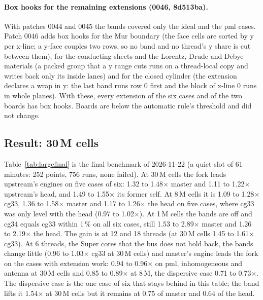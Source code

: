 \paragraph{Box hooks for the remaining extensions (0046, 8d513ba).} With patches 0044 and 0045 the bands covered only the
ideal and the pml cases. Patch 0046 adds box hooks for the Mur boundary (the face cells are sorted by y per x-line; a y-face
couples two rows, so no band and no thread's y share is cut between them), for the conducting sheets and the Lorentz, Drude and
Debye materials (a packed group that a y range cuts runs on a thread-local copy and writes back only its inside lanes) and
for the closed cylinder (the extension declares a wrap in y: the last band runs row 0 first and the block of x-line 0
runs in whole planes). With these, every extension of the six cases and of the two boards has box hooks. Boards are below the
automatic rule's threshold and did not change.

\subsection{Result: 30\,M cells}
Table~\ref{tab:largefinal} is the final benchmark of 2026-11-22 (a quiet slot of 61 minutes: 252 points, 756 runs, none failed).
At 30\,M cells the fork leads upstream's  engines on five cases of six: 1.32 to 1.48$\times$ master and 1.11
to 1.22$\times$ upstream's head, and 1.49 to 1.55$\times$ its former self. At 8\,M cells it is 1.09 to 1.28$\times$
cg33, 1.36 to 1.58$\times$ master and 1.17 to 1.26$\times$ the head on five cases, where cg33 was only level with the head (0.97 to 1.02$\times$). At 1\,M cells the bands are off and cg34 equals cg33 within 1\,\% on
all six cases, still 1.53 to 2.89$\times$ master and 1.26 to 2.19$\times$ the head. The gain is at 12 and 18 threads
(at 30\,M cells 1.45 to 1.61$\times$ cg33). At 6 threads, the Super cores that the bus does not hold back, the bands
change little (0.96 to 1.03$\times$ cg33 at 30\,M cells) and master's  engine leads the fork on the cases with
extension work: 0.94 to 0.96$\times$ on pml, inhomogeneous and antenna at 30\,M cells and 0.85 to 0.89$\times$ at 8\,M,
the dispersive case 0.71 to 0.73$\times$. The dispersive case is the one case of six that stays behind in this table; the
band lifts it 1.54$\times$ at 30\,M cells but it remains at 0.75 of master and 0.64 of the head.

